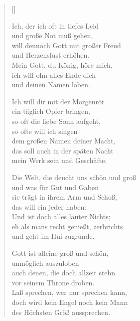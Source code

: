 \begin{multicols}{2}
\settowidth{\versewidth}{Die Welt, die deucht uns schön und groß}
\begin{verse}[\versewidth]

 Ich, der ich oft in tiefes Leid\\
und große Not muß gehen,\\
will dennoch Gott mit großer Freud\\
und Herzenslust erhöhen.\\
Mein Gott, du König, höre mich,\\
ich will ohn alles Ende dich\\
und deinen Namen loben.

 Ich will dir mit der Morgenröt\\
ein täglich Opfer bringen,\\
so oft die liebe Sonn aufgeht,\\
so ofte will ich singen\\
dem großen Namen deiner Macht,\\
das soll auch in der späten Nacht\\
mein Werk sein und Geschäfte.

 Die Welt, die deucht uns schön und groß\\
und was für Gut und Gaben\\
sie trägt in ihrem Arm und Schoß,\\
das will ein jeder haben:\\
Und ist doch alles lauter Nichts;\\
eh als mans recht genießt, zerbrichts\\
und geht im Hui zugrunde.

 Gott ist alleine groß und schön,\\
unmöglich auszuloben\\
auch denen, die doch allzeit stehn\\
vor seinem Throne droben.\\
Laß sprechen, wer nur sprechen kann,\\
doch wird kein Engel noch kein Mann\\
des Höchsten Größ aussprechen.


\end{verse}
\end{multicols}
